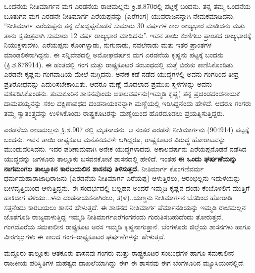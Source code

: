 ಒಂದನೆಯ ನೀತಿಮಾರ್ಗನ ಮಗ ಎರಡನೆಯ ರಾಚಮಲ್ಲನು ಕ್ರಿ.ಶ.870ರಲ್ಲಿ ಪಟ್ಟಕ್ಕೆ ಬಂದನು. ತನ್ನ ತಮ್ಮ ಒಂದನೆಯ ಬೂತುಗನ ಮಗ ಎರಡನೇ ನೀತಿಮಾರ್ಗ ಎರೆಯಪ್ಪನನ್ನು (ಎರೆಗಂಗ) ಯುವರಾಜನನ್ನಾಗಿ ನೇಮಕಮಾಡಿದನು. “ನೀತಿಮಾರ್ಗ ಎರೆಯಪ್ಪನು ತನ್ನ ದೊಡ್ಡಪ್ಪನೊಡನೆ ಸುಮಾರು 30 ವರ್ಷಗಳ ಕಾಲ ರಾಜ್ಯಭಾರ ಮಾಡಿದನು ಮತ್ತು ತಾನು ಸ್ವತಂತ್ರವಾಗಿ ಸುಮಾರು 12 ವರ್ಷ ರಾಜ್ಯಭಾರ ಮಾಡಿದನು”. ಇವನ ತಾಯಿ ಕುಣಿಗಲು ಪ್ರಾಂತದ ರಾಜ್ಯಭಾರಕ್ಕೆ ನಿಯುಕ್ತಳಾದಳು. ಎರೆಯಪ್ಪನು ಕೊಂಗಳ್ನಾಡು, ನುಗುನಾಡು, ನವಲೆನಾಡು ಮತು ಇತರ ಪ್ರಾಂತಗಳ ಮಾಂಡಲಿಕನಾಗಿದ್ದನು. ಈ ಸನ್ನಿವೇಶದಲ್ಲಿ ಅಮೋಘವರ್ಷನ ಮಗ ಎರಡನೆಯ ಕೃಷ್ಣನು ಪಟ್ಟಕ್ಕೆ ಬಂದನು (ಕ್ರಿ.ಶ.878914). ಈ ಹಂತದಲ್ಲಿ ಗಂಗ ಮತ್ತು ರಾಷ್ಟ್ರಕೂಟರ ಸಂಬಂಧದಲ್ಲಿ ಮತ್ತೆ ಬಿರುಕು ಕಾಣಿಸಿಕೊಂಡಿತು. ಎರಡನೇ ಕೃಷ್ಣನು ಗಂಗವಾಡಿಯ ಮೇಲೆ ನುಗ್ಗಿದನು. ಅನೇಕ ಕಡೆ ನಡೆದ ಯುದ್ಧಗಳಲ್ಲಿ ಅವನು ಗಂಗರಿಂದ ತೀವ್ರ ಪ್ರತಿರೋಧವನ್ನು ಎದುರಿಸಬೇಕಾಯಿತು. ಆದರೂ ಮಣ್ಣೆ ಮೊದಲಾದ ಪ್ರಮುಖ ಸ್ಥಳಗಳನ್ನು ಅವನು ವಶಪಡಿಸಿಕೊಂಡನು. ತುಮಕೂರಿನ ಶಾಸನವೊಂದು ಅಕಾಲವರ್ಷನು(ಇಮ್ಮಡಿ ಕೃಷ್ಣ) ತನ್ನ ಪ್ರಚಂಡದಂಡನಾಯಕ ದಾಮಪಯ್ಯನನ್ನು ಸಕಲ ದಕ್ಷಿಣಾಪಥದ ದಂಡನಾಯಕನನ್ನಾಗಿ ಮಣ್ಣೆಯಲ್ಲಿ ಇರಿಸಿದ್ದನೆಂದು ಹೇಳಿದೆ. ಆದರೂ ಗಂಗರು ತಮ್ಮ ಸ್ವಾತಂತ್ರ್ಯವನ್ನು ಉಳಿಸಿಕೊಂಡು ರಾಷ್ಟ್ರಕೂಟರನ್ನು ಮಣ್ಣೆಯಿಂದ ಹೊರದೂಡಲು ಪ್ರಯತ್ನಿಸುತ್ತಿದ್ದರು. 

ಎರಡನೆಯ ರಾಜಮಲ್ಲನು ಕ್ರಿ.ಶ.907 ರಲ್ಲಿ ಮೃತನಾದನು. ಆ ನಂತರ ಎರಡನೇ ನೀತಿಮಾರ್ಗನು (904914) ಪಟ್ಟಕ್ಕೆ ಬಂದನು. ಇವನ ತಾಯಿ ರಾಷ್ಟ್ರಕೂಟ ಮನೆತನದವಳೇ ಆಗಿದ್ದರೂ, ರಾಷ್ಟ್ರಕೂಟರ ವಿರುದ್ಧ ಹೋರಾಟವನ್ನು ಮುಂದುವರಿಸಿದನು. ಇದರ ಪರಿಣಾಮವಾಗಿ ಅನೇಕ ಯುದ್ಧಗಳಾದವು. ಅಕಾಲವರ್ಷನು ಎರೆಯಪ್ಪನೊಡನೆ ನಡೆಸಿದ ಯುದ್ಧವನ್ನು ಜಗಳೂರು ತಾಲ್ಲೂಕು ಬಸವನಕೋಟೆ ಶಾಸನದಲ್ಲಿ ಹೇಳಿದೆ. ಇಂತಹ \textbf{ಈ ಒಂದು ಘರ್ಷಣೆಯನ್ನು ನಾಗಮಂಗಲ ತಾಲ್ಲೂಕಿನ ಕಾರಬಯಲಿನ ಶಾಸನವು ತಿಳಿಸುತ್ತದೆ.} ನೀತಿಮಾರ್ಗ ಕೊಂಗಣಿವರ್ಮ ಧರ್ಮಮಹಾರಾಜಾಧಿ\-ರಾಜನು (ಎರಡನೆಯ ನೀತಿಮಾರ್ಗ ಎರೆಯಪ್ಪ) ಆಳುತ್ತಿರಲು, ಆರಂಭಲ್ಲನು ಇದುಳೆಯನ್ನು ಬೀಳವೃತ್ತಿಯಿಂದ ಆಳುತ್ತಿದ್ದನು. ಈ ಸಂದರ್ಭದಲ್ಲಿ ಬಲ್ಲಹನ ಅಂದರೆ ಇಮ್ಮಡಿ ಕೃಷ್ಣನ ದಂಡು ಕೆಂಬೊಳಲಿಗೆ ಮುತ್ತಿಗೆ ಹಾಕಿದಾಗ ಪಳಿಯು...ಳನು ದಂಡನಾಯಕನಾಗಿರಲು, ತ(ಳಿ)..ಯಣ್ಣನು ನೀತಿಮಾರ್ಗನ ಬೆಸದಿಂದ ಹೋರಾಡಿ ಸತ್ತನೆಂದು ಕಾರಬಯಲು ಶಾಸನ ಹೇಳುತ್ತದೆ. ಈ ಶಾಸನದ ನೀತಿಮಾರ್ಗ ಪೆರ್ಮಾನಡಿಯನ್ನು ಇಮ್ಮಡಿ ರಾಚಮಲ್ಲನ ಜೊತೆಗೂಡಿ ರಾಜ್ಯವಾಳುತ್ತಿದ್ದ ಇಮ್ಮಡಿ ನೀತಿಮಾರ್ಗ\break ಎರೆಗಂಗನೆಂದು ಗುರುತಿಸಬಹುದೆಂದು ತೋರುತ್ತದೆ, ಗಂಗದೊರೆಯ ಸಮಕಾಲೀನ ರಾಷ್ಟ್ರಕೂಟ ಅರಸ ಇಮ್ಮಡಿ ಕೃಷ್ಣನಾಗು\-ತ್ತಾನೆ. ಬೆಂಗಳೂರು ಜಿಲ್ಲೆಯ ಶಾಸನಗಳು ಹಾಗೂ ವೀರಗಲ್ಲುಗಳು ಈ ಕಾಲದ ಗಂಗ–ರಾಷ್ಟ್ರಕೂಟರ ಘರ್ಷಣೆಗಳನ್ನು ಹೇಳುತ್ತವೆ.

ಮದ್ದೂರು ತಾಲ್ಲೂಕು ಆತಕೂರು ಶಾಸನವು ಗಂಗರು ಮತ್ತು ರಾಷ್ಟ್ರಕೂಟರ ಸಂಬಂಧಗಳ ಹಾಗೂ ಸಮಕಾಲೀನ ರಾಜಕೀಯ ಪರಿಸ್ಥಿತಿಗಳ ಮಹತ್ವದ ದಾಖಲೆಯಾಗಿದ್ದು ಈಗ ಈ ಶಾಸನವು ಈಗ ಬೆಂಗಳೂರಿನ ಮ್ಯೂಸಿಯಂನಲ್ಲಿದೆ.

